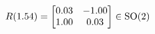 \documentclass[preview]{standalone}
\begin{document}
\begin{align*}
\special{dvisvgm:raw <g id='unique000'>}R(1.54) = \begin{bmatrix} 0.03 & -1.00 \\ 1.00 & 0.03 \end{bmatrix} \in \text{SO}(2)\special{dvisvgm:raw </g>}
\end{align*}
\end{document}
